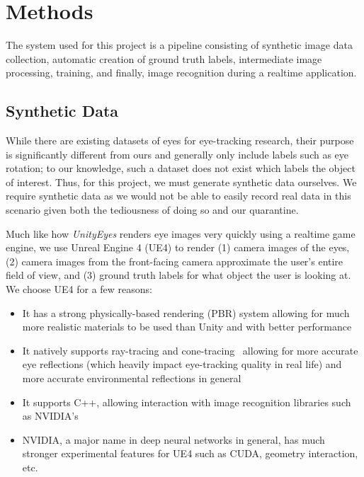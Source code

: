 \section{Methods}

The system used for this project is a pipeline consisting of synthetic image
data collection, automatic creation of ground truth labels, intermediate image
processing, training, and finally, image recognition during a realtime
application.

\subsection{Synthetic Data}

While there are existing datasets of eyes for eye-tracking research, their
purpose is significantly different from ours and generally only include labels
such as eye rotation; to our knowledge, such a dataset does not exist which
labels the object of interest. Thus, for this project, we must generate
synthetic data ourselves. We require synthetic data as we would not be able to
easily record real data in this scenario given both the tediousness of doing so
and our quarantine.

Much like how \emph{UnityEyes} renders eye images very quickly using a
realtime game engine, we use Unreal Engine 4 (UE4) to render (1) camera images
of the eyes, (2) camera images from the front-facing camera approximate the
user's entire field of view, and (3) ground truth labels for what object the
user is looking at. We choose UE4 for a few reasons:

\begin{itemize}[leftmargin=*,noitemsep]
    \item
        It has a strong physically-based rendering (PBR) system allowing for
        much more realistic materials to be used than Unity and with better
        performance
    \item
        It natively supports ray-tracing and cone-tracing~\cite{???} allowing
        for more accurate eye reflections (which heavily impact eye-tracking
        quality in real life) and more accurate environmental reflections in
        general
    \item
        It supports C++, allowing interaction with image recognition libraries
        such as NVIDIA's
    \item
        NVIDIA, a major name in deep neural networks in general, has much
        stronger experimental features for UE4 such as CUDA, geometry
        interaction, etc.
\end{itemize}

